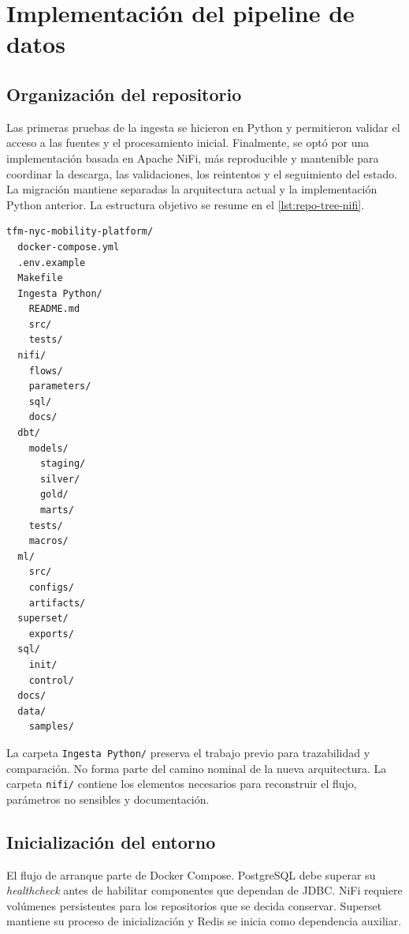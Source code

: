 \chapter{Implementación del pipeline de datos}\label{chap:pipeline}

\section{Organización del repositorio}

Las primeras pruebas de la ingesta se hicieron en Python y permitieron validar el acceso a las fuentes y el procesamiento inicial. Finalmente, se optó por una implementación basada en Apache NiFi, más reproducible y mantenible para coordinar la descarga, las validaciones, los reintentos y el seguimiento del estado. La migración mantiene separadas la arquitectura actual y la implementación Python anterior. La estructura objetivo se resume en el \cref{lst:repo-tree-nifi}.

\begin{lstlisting}[caption={Estructura objetivo del repositorio tras la migración a NiFi.},label={lst:repo-tree-nifi}]
tfm-nyc-mobility-platform/
  docker-compose.yml
  .env.example
  Makefile
  Ingesta Python/
    README.md
    src/
    tests/
  nifi/
    flows/
    parameters/
    sql/
    docs/
  dbt/
    models/
      staging/
      silver/
      gold/
      marts/
    tests/
    macros/
  ml/
    src/
    configs/
    artifacts/
  superset/
    exports/
  sql/
    init/
    control/
  docs/
  data/
    samples/
\end{lstlisting}

La carpeta \texttt{Ingesta Python/} preserva el trabajo previo para trazabilidad y comparación. No forma parte del camino nominal de la nueva arquitectura. La carpeta \texttt{nifi/} contiene los elementos necesarios para reconstruir el flujo, parámetros no sensibles y documentación.

\section{Inicialización del entorno}

El flujo de arranque parte de Docker Compose. PostgreSQL debe superar su \textit{healthcheck} antes de habilitar componentes que dependan de JDBC\@. NiFi requiere volúmenes persistentes para los repositorios que se decida conservar. Superset mantiene su proceso de inicialización y Redis se inicia como dependencia auxiliar.

